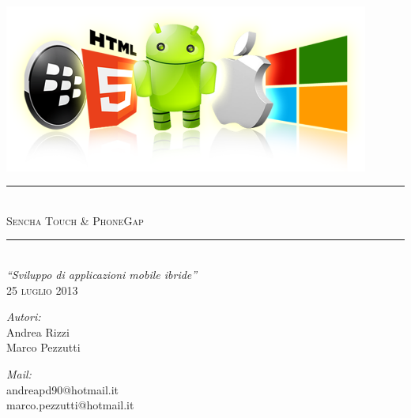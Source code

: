 \documentclass[10pt,a4paper,onecolumn]{article}
\begin{document}
\begin{titlepage}

\begin{center}
 
\textsc{\Large}\\[6cm]

\includegraphics[width=0.9\textwidth]{img/fronte.png}\\[0.3cm] 
\noindent\rule{\textwidth}{0.4pt} \\[0.3cm]
\textsc{\Large Sencha Touch \& PhoneGap}\\[0.1cm]
\noindent\rule{\textwidth}{0.4pt}\\[0.5cm]
\textit{``Sviluppo di applicazioni mobile ibride''} \\[0.5cm]
\textsc{25 luglio 2013}\\[0.5cm]
\begin{minipage}{0.4\textwidth}
\begin{flushleft} \large
\emph{Autori:}\\
Andrea Rizzi\\
Marco Pezzutti
\end{flushleft}
\end{minipage}
\begin{minipage}{0.4\textwidth}
\begin{flushright} \large
\emph{Mail:} \\
andreapd90@hotmail.it\\
marco.pezzutti@hotmail.it
\end{flushright}
\end{minipage}
\end{center}
\end{titlepage}

\clearpage
{}
\tableofcontents
\end{document}
